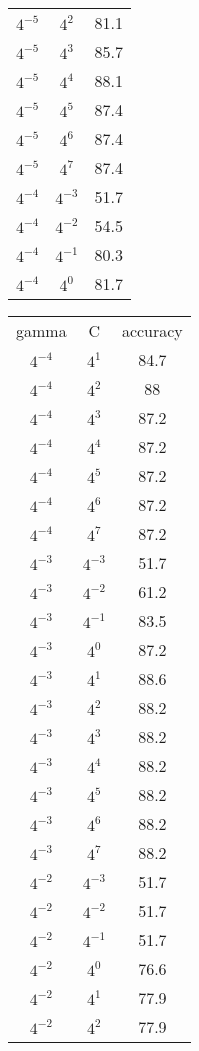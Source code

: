 \documentclass[12pt]{article}
\newenvironment{problem}[2][Problem]{\begin{trivlist}
\item[\hskip \labelsep {\bfseries #1}\hskip \labelsep {\bfseries #2}]}{\end{trivlist}}
\begin{document}
\begin{problem}{5. Programming}
\begin{center}
\begin{tabular}{ c | c | c }
$4^{-5}$   & $4^{2}$  &  81.1\\
$4^{-5}$   & $4^{3}$  &  85.7\\
$4^{-5}$   & $4^{4}$  &  88.1\\
$4^{-5}$   & $4^{5}$  &  87.4\\
$4^{-5}$   & $4^{6}$  &  87.4\\
$4^{-5}$   & $4^{7}$  &  87.4\\
$4^{-4}$   & $4^{-3}$  &  51.7\\
$4^{-4}$   & $4^{-2}$  &  54.5\\
$4^{-4}$   & $4^{-1}$  &  80.3\\
$4^{-4}$   & $4^{0}$  &  81.7\\
\end{tabular}
\begin{tabular}{ c | c | c }
gamma & C & accuracy\\
$4^{-4}$   & $4^{1}$  &  84.7\\
$4^{-4}$   & $4^{2}$  &  88\\
$4^{-4}$   & $4^{3}$  &  87.2\\
$4^{-4}$   & $4^{4}$  &  87.2\\
$4^{-4}$   & $4^{5}$  &  87.2\\
$4^{-4}$   & $4^{6}$  &  87.2\\
$4^{-4}$   & $4^{7}$  &  87.2\\
$4^{-3}$   & $4^{-3}$  &  51.7\\
$4^{-3}$   & $4^{-2}$  &  61.2\\
$4^{-3}$   & $4^{-1}$  &  83.5\\
$4^{-3}$   & $4^{0}$  &  87.2\\
$4^{-3}$   & $4^{1}$  &  88.6\\
$4^{-3}$   & $4^{2}$  &  88.2\\
$4^{-3}$   & $4^{3}$  &  88.2\\
$4^{-3}$   & $4^{4}$  &  88.2\\
$4^{-3}$   & $4^{5}$  &  88.2\\
$4^{-3}$   & $4^{6}$  &  88.2\\
$4^{-3}$   & $4^{7}$  &  88.2\\
$4^{-2}$   & $4^{-3}$  &  51.7\\
$4^{-2}$   & $4^{-2}$  &  51.7\\
$4^{-2}$   & $4^{-1}$  &  51.7\\
$4^{-2}$   & $4^{0}$  &  76.6\\
$4^{-2}$   & $4^{1}$  &  77.9\\
$4^{-2}$   & $4^{2}$  &  77.9\\

\end{tabular}
\end{center}
\end{problem}
\end{document}
